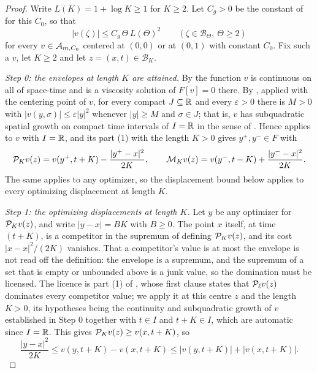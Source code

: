 \begin{proof}
Write $L(K)=1+\log K\ge1$ for $K\ge2$. Let $C_g>0$ be the constant of
 for this $C_0$, so that
\begin{equation}\label{eq:feb-growth}
  |v(\zeta)|\le C_g\,\Theta\,L(\Theta)^2
  \qquad(\zeta\in\mathcal B_\Theta,\ \Theta\ge2)
\end{equation}
for every $v\in\mathcal{A}_{m,C_0}$ centered at $(0,0)$ or at $(0,1)$ with constant
$C_0$. Fix such a $v$, let $K\ge2$ and let $z=(x,t)\in\mathcal B_K$.

\emph{Step 0: the envelopes at length $K$ are attained.}
By  the function $v$ is continuous on all of space-time and
is a viscosity solution of $F[v]=0$ there. By ,
applied with the centering point of $v$, for every compact $J\subseteq\mathbb{R}$ and
every $\varepsilon>0$ there is $M>0$ with $|v(y,\sigma)|\le\varepsilon|y|^2$
whenever $|y|\ge M$ and $\sigma\in J$; that is, $v$ has subquadratic spatial
growth on compact time intervals of $I=\mathbb{R}$ in the sense of
. Hence  applies to $v$
with $I=\mathbb{R}$, and its part (1) with the length $K>0$ gives $y^+,y^-\in F$ with
\begin{equation}\label{eq:feb-attain}
  \mathcal{P}_Kv(z)=v(y^+,t+K)-\frac{|y^+-x|^2}{2K},
  \qquad
  \mathcal{M}_Kv(z)=v(y^-,t-K)+\frac{|y^--x|^2}{2K}.
\end{equation}
The same applies to any optimizer, so the displacement bound below applies to
every optimizing displacement at length $K$.

\emph{Step 1: the optimizing displacements at length $K$.}
Let $y$ be any optimizer for $\mathcal{P}_Kv(z)$, and write $|y-x|=BK$ with $B\ge0$.
The point $x$ itself, at time $(t+K)$, is a competitor in the supremum of
 defining $\mathcal{P}_Kv(z)$, and its cost $|x-x|^2/(2K)$ vanishes.
That a competitor's value is at most the envelope is not read off the definition:
the envelope is a supremum, and the supremum of a set that is empty or unbounded
above is a junk value, so the domination must be licensed. The licence is part (1)
of , whose first clause states that
$\mathcal{P}_\ell v(z)$ dominates every competitor value; we apply it at this centre $z$
and the length $K>0$, its hypotheses being the continuity and subquadratic growth of
$v$ established in Step 0 together with $t\in I$ and $t+K\in I$, which are automatic
since $I=\mathbb{R}$. This gives $\mathcal{P}_Kv(z)\ge v(x,t+K)$, so
\begin{equation}\label{eq:feb-compare}
  \frac{|y-x|^2}{2K}\le v(y,t+K)-v(x,t+K)
   \le|v(y,t+K)|+|v(x,t+K)| .
\end{equation}


\end{proof}
